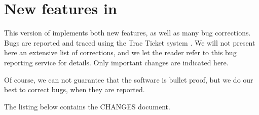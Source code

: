 
\chapter{New features in \MCS \version\ }
\label{c:changes}


This version of \MCS implements both new features, as well as many bug corrections. Bugs are reported and traced using the \MCS Trac Ticket system \cite{mczilla_webpage}. We will not present here an extensive list of corrections, and we let the reader refer to this bug reporting service for details. Only important changes are indicated here.

Of course, we can not guarantee that the software is bullet proof, but we do our best to correct bugs, when they are reported.

The listing below contains the \MCS \version CHANGES document.

